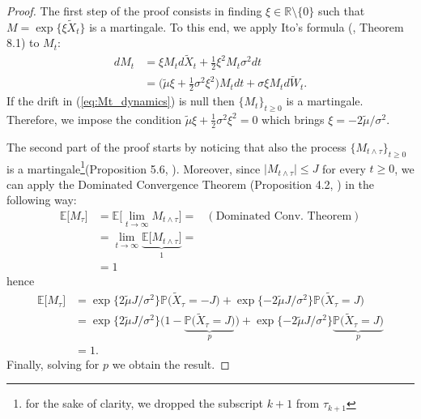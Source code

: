 \begin{proof}
	The first step of the proof consists in finding $\xi \in \mathbb{R}\setminus\{0\}$ such that $M=\exp\{\xi \widetilde{X}_t\}$ is a martingale. To this end, we apply Ito's formula (\cite{baldi2017}, Theorem 8.1) to $M_t$:
	\begin{align}\label{eq:Mt_dynamics}
	\nonumber
	dM_t & = \xi M_t d\widetilde{X}_t+\frac{1}{2}\xi^2M_t\sigma^2dt\\
	     & = \Big(\widetilde{\mu}\xi + \frac{1}{2}\sigma^2\xi^2\Big)M_t dt + \sigma\xi M_t d\widetilde{W}_t.
	\end{align}
	If the drift in (\ref{eq:Mt_dynamics}) is null then $\{M_t\}_{t\geq0}$ is a martingale. Therefore, we impose the condition $\widetilde{\mu}\xi + \frac{1}{2}\sigma^2\xi^2 = 0$ which brings $ \xi = -2\widetilde{\mu}/\sigma^2$.
	
	The second part of the proof starts by noticing that also the process $\{M_{t\wedge\tau}\}_{t\geq 0}$ is a martingale\footnote{for the sake of clarity, we dropped the subscript $k+1$ from $\tau_{k+1}$}(Proposition 5.6, \cite{baldi2017}). Moreover, since $\lvert M_{t\wedge\tau} \lvert \leq J$ for every $t\geq0$, we can apply the Dominated Convergence Theorem (Proposition 4.2, \cite{baldi2017}) in the following way:
	\begin{align*}
	\mathbb{E}\big[M_{\tau}\big] & = \mathbb{E}\Big[\lim\limits_{t\to\infty}M_{t\wedge\tau}\Big] = & (\text{Dominated Conv. Theorem})\\[2ex]
	& = \lim\limits_{t\to\infty}\underbrace{\mathbb{E}\big[M_{t\wedge\tau}\big]}_{1}=\\
	& = 1
	\end{align*}
	hence
	\begin{align*}
	\mathbb{E}\big[M_{\tau}\big] & = \exp\{2\widetilde{\mu}J/\sigma^2\}\mathbb{P}\Big(\widetilde{X}_{\tau}=-J\Big) + \exp\{-2\widetilde{\mu}J/\sigma^2\}\mathbb{P}\Big(\widetilde{X}_{\tau}=J\Big) \\[2ex]
	& = \exp\{2\widetilde{\mu}J/\sigma^2\}\bigg(1-\underbrace{\mathbb{P}\Big(\widetilde{X}_{\tau}=J\Big)}_{p}\bigg) + \exp\{-2\widetilde{\mu}J/\sigma^2\}\underbrace{\mathbb{P}\Big(\widetilde{X}_{\tau}=J\Big)}_{p} \\
	& = 1.
	\end{align*}
	Finally, solving for $p$ we obtain the result.
\end{proof}


